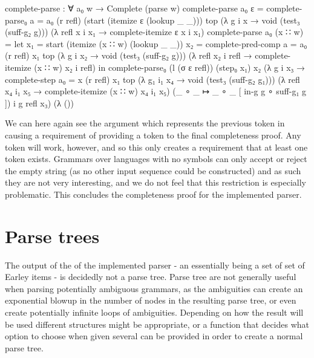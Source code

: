 		\begin{code}
			  complete-parse : ∀ a₀ w →
			    Complete (parse w)
			  complete-parse a₀ ε =
			    complete-parse₀ {a = a₀} (r refl) (start (itemize ε (lookup _ _))) top
			      (λ {g i x → void (test₃ (suff-g₂ g))})
			      (λ {refl x i x₁ → complete-itemize ε x i x₁})
			  complete-parse a₀ (x ∷ w) =
			    let
			      x₁ = start (itemize (x ∷ w) (lookup _ _)) 
			      x₂ = complete-pred-comp {a = a₀} (r refl) x₁ top
			        (λ {g i x₂ → void (test₃ (suff-g₂ g))})
			        (λ {refl x₂ i refl → complete-itemize (x ∷ w) x₂ i refl})
			    in
			    complete-parse₀ (l (σ ε refl)) (step₀ x₁) x₂
			      (λ g i x₃ → complete-step {a₀ = x} (r refl) x₁ top
			        (λ {g₁ i₁ x₄ → void (test₃ (suff-g₂ g₁))})
			        (λ {refl x₄ i₁ x₅ → complete-itemize (x ∷ w) x₄ i₁ x₅})
			        (_ ∘ _ ↦ _ ∘ _ [ in-g g ∘ suff-g₁ g ]) i g refl x₃)
			      (λ ())
		\end{code}

		We can here again see the argument  which represents the
		previous token in  causing a requirement of
		providing a token to the final completeness proof. Any token will work,
		however, and so this only creates a requirement that at least one token
		exists. Grammars over languages with no symbols can only accept or
		reject the empty string (as no other input sequence could be
		constructed) and as such they are not very interesting, and we do not
		feel that this restriction is especially problematic. This concludes
		the completeness proof for the implemented parser.

	\section{Parse trees}

		The output of the of the implemented parser - an 
		essentially being a set of set of Earley items - is decidedly not a
		parse tree.  Parse tree are not generally useful when parsing
		potentially ambiguous grammars, as the ambiguities can create an
		exponential blowup in the number of nodes in the resulting parse tree,
		or even create potentially infinite loops of ambiguities. Depending on
		how the result will be used different structures might be appropriate, 
		or a function that decides what option to choose when given several can 
		be provided in order to create a normal parse tree.
